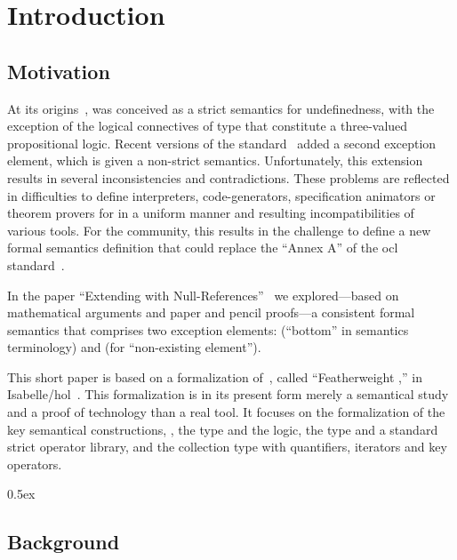 \part{Introduction}
\chapter{Motivation}
At its origins~\cite{richters:precise:2002,omg:ocl:1997}, \OCL was
conceived as a strict semantics for undefinedness, with the exception
of the logical connectives of type  that constitute
a three-valued propositional logic.  Recent versions of the \OCL
standard~\cite{omg:ocl:2006,omg:ocl:2012} added a second exception
element, which is given a non-strict semantics.  Unfortunately, this
extension results in several inconsistencies and contradictions. These
problems are reflected in difficulties to define interpreters,
code-generators, specification animators or theorem provers for \OCL
in a uniform manner and resulting incompatibilities of various
tools. For the \OCL community, this results in the challenge to define
a new formal semantics definition \OCL that could replace the ``Annex
A'' of the \acs{ocl} standard~\cite{omg:ocl:2012}.

In the paper ``Extending \OCL with
Null-References''~\cite{brucker.ea:ocl-null:2009} we explored---based
on mathematical arguments and paper and pencil proofs---a consistent
formal semantics that comprises two exception elements:
 (``bottom'' in semantics terminology) and
 (for ``non-existing element'').

This short paper is based on a formalization
of~\cite{brucker.ea:ocl-null:2009}, called ``Featherweight \OCL,'' in
Isabelle/\acs{hol}~\cite{nipkow.ea:isabelle:2002}.  This formalization
is in its present form merely a semantical study and a proof of
technology than a real tool. It focuses on the formalization of the
key semantical constructions, \ie, the type  and
the logic, the type  and a standard strict operator
library, and the collection type  with quantifiers,
iterators and key operators.



\parindent 0pt\parskip 0.5ex


\chapter{Background}

